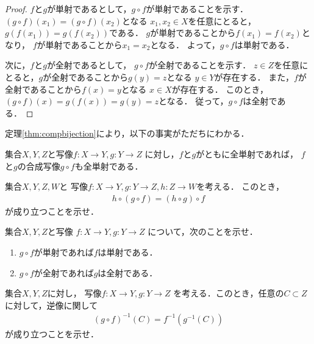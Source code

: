     \begin{proof}
      $f$と$g$が単射であるとして，$g \circ f$が単射であることを示す．
      $(g \circ f ) (x_1)=(g \circ f)(x_2)$となる
      $x_1 ,  x_2 \in X$を任意にとると，
      $g(f(x_1))=g(f(x_2))$である．
      $g$が単射であることから$f(x_1)=f(x_2)$となり，
      $f$が単射であることから$x_1 = x_2$となる．
      よって，$g \circ f$は単射である．

      次に，$f$と$g$が全射であるとして，
      $g \circ f$が全射であることを示す．
      $z \in Z$を任意にとると，$g$が全射であることから$g(y) =z$となる
      $y \in Y$が存在する．
      また，$f$が全射であることから$f(x)=y$となる
      $x \in X$が存在する．
      このとき，$(g \circ f)(x) = g(f(x))=g(y)=z$となる．
      従って，$g \circ f$は全射である．
    \end{proof}
    定理\ref{thm:compbijection}により，以下の事実がただちにわかる．
    \begin{coro}
      集合$X,  Y,  Z$と写像$f: X \longrightarrow Y,  g: Y \longrightarrow Z$
      に対し，$f$と$g$がともに全単射であれば，
      $f$と$g$の合成写像$g \circ f$も全単射である．
    \end{coro}

    \begin{que} \label{que:mapassociative}
      集合$X,  Y,  Z,  W$と
      写像$f:X \longrightarrow Y,  g :Y \longrightarrow Z,  
      h : Z \longrightarrow W$を考える．
      このとき，
      \begin{align}
        h \circ (g \circ f) = ( h \circ g) \circ f
        \label{eq:associativemap}
      \end{align}
      が成り立つことを示せ．
    \end{que}

    \begin{que} \label{que:mapinjesurjecomp}
      集合$X,  Y,  Z$と写像
      $f:X \longrightarrow Y,  g: Y \longrightarrow Z$
      について，次のことを示せ．
      \begin{enumerate}
        \item $g \circ f$が単射であれば$f$は単射である．
        \item $g \circ f$が全射であれば$g$は全射である．
      \end{enumerate}
    \end{que}

    \begin{que} \label{que:compinvset}
      集合$X,  Y,  Z$に対し，
      写像$f: X \longrightarrow Y,  g: Y \longrightarrow Z$
      を考える．このとき，任意の$C \subset Z$に対して，逆像に関して
      \begin{align}
        (g \circ f)^{-1} (C) = f^{-1}(g^{-1} (C))
        \label{eq:compinvset}
      \end{align}
      が成り立つことを示せ．
    \end{que}
%
